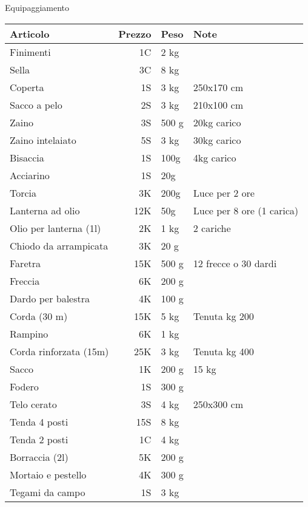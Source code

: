 \begin{table*}
  \begin{center}
    {\Large\sc Equipaggiamento}\medskip
    
    \small\begin{tabular}{|l|r|p{1cm}|p{8cm}|}
      \hline
      Articolo& Prezzo& Peso & Note  \\ \hline
      \hline
      Finimenti& 1C& 2 kg& \\ \hline
      Sella&3C& 8 kg& \\ \hline
      Coperta& 1S& 3 kg& 250x170 cm  \\ \hline
      Sacco a pelo& 2S &3 kg& 210x100 cm \\ \hline
      Zaino& 3S& 500 g& 20kg carico \\ \hline
      Zaino intelaiato& 5S& 3 kg& 30kg carico \\ \hline
      Bisaccia& 1S& 100g& 4kg carico \\ \hline
      Acciarino& 1S& 20g&\\ \hline
      Torcia& 3K& 200g& Luce per 2 ore \\ \hline
      Lanterna ad olio& 12K& 50g& Luce per 8 ore (1 carica)\\ \hline
      Olio per lanterna (1l)& 2K& 1 kg& 2 cariche \\ \hline
      Chiodo da arrampicata& 3K& 20 g&\\ \hline
      Faretra& 15K& 500 g& 12 frecce o 30 dardi \\ \hline
      Freccia& 6K& 200 g&\\ \hline
      Dardo per balestra& 4K& 100 g&\\ \hline
      Corda (30 m)& 15K& 5 kg& Tenuta kg 200 \\ \hline
      Rampino& 6K& 1 kg&\\ \hline
      Corda rinforzata (15m)& 25K& 3 kg& Tenuta kg 400 \\ \hline
      Sacco& 1K& 200 g& 15 kg \\ \hline
      Fodero& 1S& 300 g&\\ \hline
      Telo cerato& 3S& 4 kg& 250x300 cm \\ \hline
      Tenda 4 posti& 15S& 8 kg&\\ \hline
      Tenda 2 posti& 1C& 4 kg&\\ \hline
      Borraccia (2l)& 5K& 200 g&\\ \hline
      Mortaio e pestello& 4K& 300 g&\\ \hline
      Tegami da campo& 1S& 3 kg&\\ \hline

\end{tabular}
\end{center}
\end{table*}
